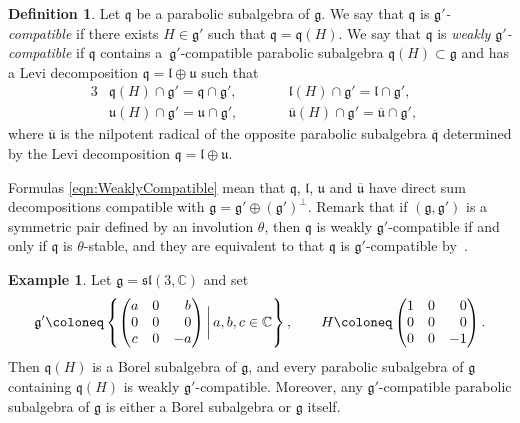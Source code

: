 \documentclass[pdftex]{sigma}
\numberwithin{equation}{section}
\theoremstyle{definition}
\newtheorem{Definition}[Theorem]{Definition}
\newtheorem{Example}[Theorem]{Example}
\newcommand{\set}[1]{\left\{#1 \right\}}
\newcommand{\BasicRing}[1]{\mathbb{#1}}
\newcommand{\CC}{\BasicRing{C}}
\newcommand{\classicalg}[1]{\mathfrak{#1}}
\newcommand{\lie}[1]{\mathfrak{#1}}
\newcommand{\lieSL}{\classicalg{sl}}
\begin{document}
\begin{Definition}\label{def:WeaklyCompatible}
	Let $\lie{q}$ be a parabolic subalgebra of $\lie{g}$.
	We say that $\lie{q}$ is \emph{$\lie{g'}$-compatible} if there exists $H \in \lie{g'}$ such that $\lie{q} = \lie{q}(H)$.
	We say that $\lie{q}$ is \emph{weakly $\lie{g'}$-compatible} if $\lie{q}$ contains a~$\lie{g'}$-compatible parabolic subalgebra $\lie{q}(H) \subset \lie{g}$ and has a Levi decomposition $\lie{q} = \lie{l} \oplus \lie{u}$ such that
	\begin{alignat}{3}
		&\lie{q}(H) \cap \lie{g'} = \lie{q} \cap \lie{g}', \qquad&& \lie{l}(H)\cap \lie{g'} = \lie{l} \cap \lie{g}',& \nonumber \\
		&\lie{u}(H)\cap \lie{g'} = \lie{u} \cap \lie{g}', \qquad&& \lie{\overline{u}}(H)\cap \lie{g'} = \lie{\overline{u}} \cap \lie{g'},& \label{eqn:WeaklyCompatible}
	\end{alignat}
	where $\lie{\overline{u}}$ is the nilpotent radical of the opposite parabolic subalgebra $\lie{\overline{q}}$ determined by the Levi decomposition $\lie{q} = \lie{l}\oplus \lie{u}$.
\end{Definition}

Formulas \eqref{eqn:WeaklyCompatible} mean that $\lie{q}$, $\lie{l}$, $\lie{u}$ and $\lie{\overline{u}}$ have direct sum decompositions compatible with $\lie{g} = \lie{g'}\oplus (\lie{g'})^\perp$.
Remark that if $(\lie{g}, \lie{g'})$ is a symmetric pair defined by an involution $\theta$,
then $\lie{q}$ is weakly $\lie{g'}$-compatible if and only if $\lie{q}$ is $\theta$-stable,
and they are equivalent to that $\lie{q}$ is $\lie{g'}$-compatible by~\cite[Proposition~4.76]{KnVo95_cohomological_induction}.

\begin{Example}
	Let $\lie{g} = \lieSL(3, \CC)$ and set
	\begin{align*}
		\lie{g'} \coloneq \set{\begin{pmatrix} a & 0 & \hphantom{-}b \\ 0 & 0 & \hphantom{-}0 \\ c & 0 & -a \end{pmatrix} \bigg|\, a, b, c \in \CC}, \qquad H \coloneq \begin{pmatrix} 1 & 0 & \hphantom{-}0 \\ 0 & 0 & \hphantom{-}0 \\ 0 & 0 & -1 \end{pmatrix}.
	\end{align*}
	Then $\lie{q}(H)$ is a Borel subalgebra of $\lie{g}$, and every parabolic subalgebra of $\lie{g}$ containing $\lie{q}(H)$ is weakly $\lie{g'}$-compatible.
	Moreover, any $\lie{g'}$-compatible parabolic subalgebra of $\lie{g}$ is either a Borel subalgebra or $\lie{g}$ itself.
\end{Example}
\end{document}
